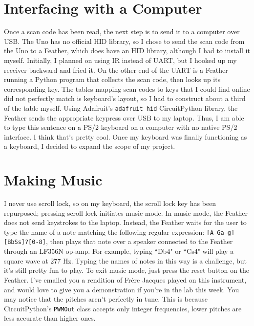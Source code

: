 \documentclass[12pt]{article}
\begin{document}
\section*{Interfacing with a Computer}

    Once a scan code has been read, the next step is to send it to a computer over USB.
    The Uno has no official HID library, so I chose to send the scan code from the Uno to a Feather, which does have an HID library, although I had to install it myself.
    Initially, I planned on using IR instead of UART, but I hooked up my receiver backward and fried it.
    On the other end of the UART is a Feather running a Python program that collects the scan code, then looks up its corresponding key.
    The tables mapping scan codes to keys that I could find online did not perfectly match is keyboard's layout, so I had to construct about a third of the table myself.
    Using Adafruit's \texttt{adafruit\_hid} CircuitPython library, the Feather sends the appropriate keypress over USB to my laptop.
    Thus, I am able to type this sentence on a PS/2 keyboard on a computer with no native PS/2 interface.
    I think that's pretty cool.
    Once my keyboard was finally functioning as a keyboard, I decided to expand the scope of my project.

\section*{Making Music}

    I never use scroll lock, so on my keyboard, the scroll lock key has been repurposed; pressing scroll lock initiates music mode.
    In music mode, the Feather does not send keystrokes to the laptop.
    Instead, the Feather waits for the user to type the name of a note matching the following regular expression: \texttt{[A-Ga-g][BbSs]?[0-8]}, then plays that note over a speaker connected to the Feather through an LF356N op-amp.
    For example, typing ``Db4" or ``Cs4" will play a square wave at 277 Hz.
    Typing the names of notes in this way is a challenge, but it's still pretty fun to play.
    To exit music mode, just press the reset button on the Feather.
    I've emailed you a rendition of Frère Jacques played on this instrument, and would love to give you a demonstration if you're in the lab this week.
    You may notice that the pitches aren't perfectly in tune.
    This is because CircuitPython's \texttt{PWMOut} class accepts only integer frequencies, lower pitches are less accurate than higher ones.
\end{document}
